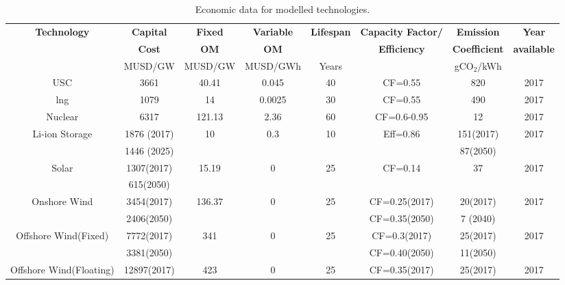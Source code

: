 \begin{landscape}
\begin{longtable}{ |*{8}{c|} }
\caption{Economic data for modelled technologies.}\\
\hline
\textbf{Technology} & \textbf{Capital} & \textbf{Fixed} & \textbf{Variable} & \textbf{Lifespan} & \textbf{Capacity Factor/} & \textbf{Emission} & \textbf{Year} \\
 & \textbf{Cost} & \textbf{\gls{OM}} & \textbf{\gls{OM}} &  & \textbf{Efficiency} & \textbf{Coefficient} & \textbf{available} \\
 & MUSD/GW & MUSD/GW & MUSD/GWh & Years  &  & gCO$_2$/kWh  &  \\
\hline
\endhead  %
\hline
\endfoot  %
\hline
\endlastfoot
\gls{USC} \cite{eia_cost_2020,intergovernmental_panel_on_climate_change_climate_2014} & 3661 & 40.41 & 0.045 & 40 & CF=0.55 & 820 & 2017 \\
\gls{lng}\cite{eia_cost_2020,intergovernmental_panel_on_climate_change_climate_2014} & 1079 & 14 & 0.0025 & 30 & CF=0.55 & 490 & 2017 \\
Nuclear \cite{eia_cost_2020,intergovernmental_panel_on_climate_change_climate_2014,lokhov_load-following_2011} & 6317 & 121.13 & 2.36 & 60 & CF=0.6-0.95 & 12 & 2017 \\
Li-ion Storage \cite{mongird_energy_2019,emilsson_lithium-ion_2019} & 1876 (2017) & 10 & 0.3 & 10 & Eff=0.86 & 151(2017) & 2017 \\
 & 1446 (2025) &  &  &  &  & 87(2050) &  \\
Solar \cite{eia_cost_2020,intergovernmental_panel_on_climate_change_climate_2014} & 1307(2017) & 15.19 & 0  & 25 & CF=0.14 & 37 & 2017 \\
 & 615(2050) & & & & & &  \\
Onshore Wind & 3454(2017) & 136.37 & 0 & 25 & CF=0.25(2017) & 20(2017) & 2017 \\
\cite{eia_cost_2020,intergovernmental_panel_on_climate_change_climate_2014,kato_energy_2016,govindji_appraisal_2012,heger_wind_2016} & 2406(2050) &  &  &  & CF=0.35(2050) & 7 (2040) &  \\
Offshore Wind(Fixed) & 7772(2017) & 341 & 0 & 25 & CF=0.3(2017) & 25(2017) & 2017 \\
\cite{eia_cost_2020,intergovernmental_panel_on_climate_change_climate_2014,kato_energy_2016,govindji_appraisal_2012,heger_wind_2016} & 3381(2050) &  &  & & CF=0.40(2050) & 11(2050) &  \\
Offshore Wind(Floating) & 12897(2017) & 423 & 0 & 25 & CF=0.35(2017) & 25(2017) & 2017 \\

\end{longtable}
\end{landscape}
